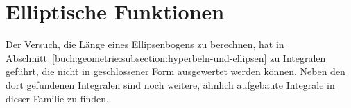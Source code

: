 %
%
%
\chapter{Elliptische Funktionen
\label{buch:chapter:elliptischefunktionen}}
\rhead{}

Der Versuch, die Länge eines Ellipsenbogens zu berechnen, hat
in Abschnitt~\ref{buch:geometrie:subsection:hyperbeln-und-ellipsen}
zu Integralen geführt, die nicht in geschlossener Form ausgewertet
werden können.
Neben den dort gefundenen Integralen sind noch weitere, ähnlich
aufgebaute Integrale in dieser Familie zu finden.






